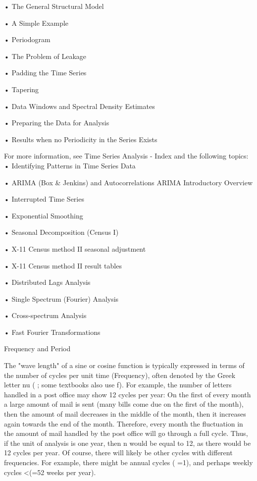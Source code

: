 •
The General Structural Model

•
A Simple Example

•
Periodogram

•
The Problem of Leakage

•
Padding the Time Series

•
Tapering

•
Data Windows and Spectral Density Estimates

•
Preparing the Data for Analysis

•
Results when no Periodicity in the Series Exists


For more information, see Time Series Analysis - Index and the following topics:
•
Identifying Patterns in Time Series Data

•
ARIMA (Box & Jenkins) and Autocorrelations ARIMA Introductory Overview

•
Interrupted Time Series

•
Exponential Smoothing

•
Seasonal Decomposition (Census I)

•
X-11 Census method II seasonal adjustment

•
X-11 Census method II result tables

•
Distributed Lags Analysis

•
Single Spectrum (Fourier) Analysis

•
Cross-spectrum Analysis

•
Fast Fourier Transformations



Frequency and Period

The "wave length" of a sine or cosine function is typically expressed in terms of the number of cycles per unit time (Frequency), often denoted by the Greek letter nu ( ; some textbooks also use f). For example, the number of letters handled in a post office may show 12 cycles per year: On the first of every month a large amount of mail is sent (many bills come due on the first of the month), then the amount of mail decreases in the middle of the month, then it increases again towards the end of the month. Therefore, every month the fluctuation in the amount of mail handled by the post office will go through a full cycle. Thus, if the unit of analysis is one year, then n would be equal to 12, as there would be 12 cycles per year. Of course, there will likely be other cycles with different frequencies. For example, there might be annual cycles ( =1), and perhaps weekly cycles <(=52 weeks per year).

